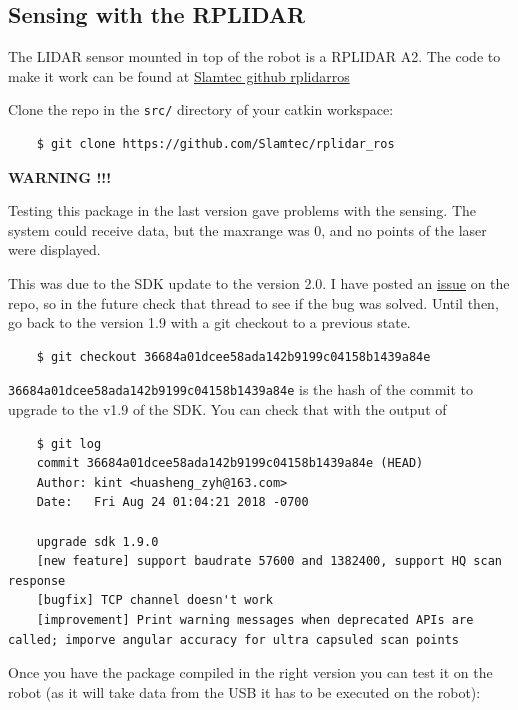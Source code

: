 \documentclass{article}
\begin{document}
\subsection{Sensing with the RPLIDAR}

The LIDAR sensor mounted in top of the robot is a RPLIDAR A2. The code to make it work can be found at \href{https://github.com/Slamtec/rplidar_ros}{Slamtec github rplidar\textunderscore ros}

Clone the repo in the \verb|src/| directory of your catkin workspace:
\begin{verbatim}
    $ git clone https://github.com/Slamtec/rplidar_ros
\end{verbatim}

\textbf{WARNING !!!}

Testing this package in the last version gave problems with the sensing. The system could receive data, but the max\textunderscore range was 0, and no points of the laser were displayed. 

This was due to the SDK update to the version 2.0. I have posted an \href{https://github.com/Slamtec/rplidar_ros/issues/67#issue-1064430009}{issue} on the repo, so in the future check that thread to see if the bug was solved. Until then, go back to the version 1.9 with a git checkout to a previous state.

\begin{verbatim}
    $ git checkout 36684a01dcee58ada142b9199c04158b1439a84e
\end{verbatim}

\verb|36684a01dcee58ada142b9199c04158b1439a84e| is the hash of the commit to upgrade to the v1.9 of the SDK. You can check that with the output of

\begin{verbatim}
    $ git log
    commit 36684a01dcee58ada142b9199c04158b1439a84e (HEAD)
    Author: kint <huasheng_zyh@163.com>
    Date:   Fri Aug 24 01:04:21 2018 -0700

    upgrade sdk 1.9.0
    [new feature] support baudrate 57600 and 1382400, support HQ scan response
    [bugfix] TCP channel doesn't work
    [improvement] Print warning messages when deprecated APIs are called; imporve angular accuracy for ultra capsuled scan points
\end{verbatim}

Once you have the package compiled in the right version you can test it on the robot (as it will take data from the USB it has to be executed on the robot):
\end{document}
